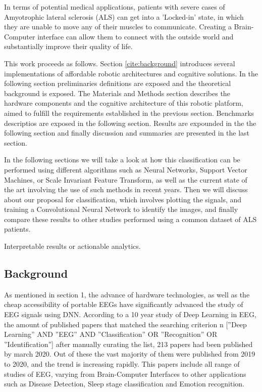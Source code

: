 \documentclass[conference]{IEEEtran}
\begin{document}
In terms of potential medical applications, patients with severe cases of Amyotrophic lateral sclerosis (ALS) can get into a 'Locked-in' state, in which they are unable to move any of their muscles to communicate. Creating a Brain-Computer interface can allow them to connect with the outside world  and substantially improve their quality of life\cite{GUY20185}.


This work proceeds as follows.  Section \ref{cite:background} introduces several implementations of affordable robotic architectures and cognitive solutions.  In the following section preliminaries definitions are exposed and the theoretical background is exposed.  The Materials and Methods section describes the hardware components and the cognitive architecture of this robotic platform, aimed to fulfill the requirements established in the previous section.  Benchmarks descriptios are exposed in the following section.  Results are expounded in the the following section and finally discussion and summaries are presented in the last section.

In the following sections we will take a look at how this classification can be performed using different algorithms such as Neural Networks, Support Vector Machines, or Scale Invariant Feature Transform, as well as the current state of the art  involving the use of such methods in recent years. Then we will discuss about our proposal for classification, which involves plotting the signals, and training a Convolutional Neural Network to identify the images, and finally compare these results to other studies performed using a common dataset of ALS patients.

Interpretable results or actionable analytics.

\subsection{Background}
\label{background}


As mentioned in section 1, the advance of hardware technologies, as well as the cheap accessibility of portable EEGs have significantly advanced the study of EEG signals using DNN. According to a 10 year study of Deep Learning in EEG\cite{dnn10years}, the amount of published papers that matched the searching criterion n [”Deep Learning” AND ”EEG” AND ”Classification” OR ”Recognition” OR ”Identification”] after manually curating the list, 213 papers had been published by march 2020. Out of these the vast majority of them were published from 2019 to 2020, and the trend is increasing rapidly. This papers include all range of studies of EEG, varying from Brain-Computer Interfaces to other applications such as Disease Detection, Sleep stage classification and Emotion recognition. 
\end{document}
